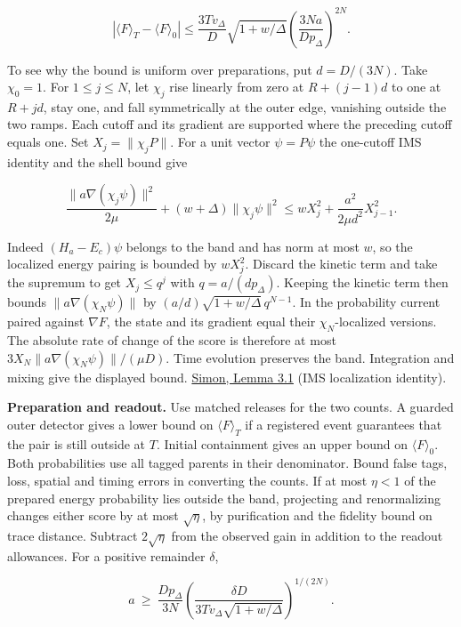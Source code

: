 \documentclass[11pt,a4paper]{article}
\begin{document}
\[
 |\langle F\rangle_T-\langle F\rangle_0|
 \le \frac{3T v_\Delta}{D}\sqrt{1+w/\Delta}
        \left(\frac{3N a}{D p_\Delta}\right)^{2N}.
\]

To see why the bound is uniform over preparations, put \(d=D/(3N)\).
Take \(\chi_0=1\). For \(1\le j\le N\), let \(\chi_j\) rise linearly
from zero at \(R+(j-1)d\) to one at \(R+jd\), stay one, and fall
symmetrically at the outer edge, vanishing outside the two ramps. Each
cutoff and its gradient are supported where the preceding cutoff equals
one. Set \(X_j=\|\chi_jP\|\). For a unit vector \(\psi=P\psi\) the
one-cutoff IMS identity and the shell bound give

\[
 \frac{\|a\nabla(\chi_j\psi)\|^2}{2\mu}
       +(w+\Delta)\|\chi_j\psi\|^2
 \le w X_j^2+\frac{a^2}{2\mu d^2}X_{j-1}^2 .
\]

Indeed \((H_a-E_c)\psi\) belongs to the band and has norm at most \(w\),
so the localized energy pairing is bounded by \(wX_j^2\). Discard the
kinetic term and take the supremum to get \(X_j\le q^j\) with
\(q=a/(d p_\Delta)\). Keeping the kinetic term then bounds
\(\|a\nabla(\chi_N\psi)\|\) by \((a/d)\sqrt{1+w/\Delta}\,q^{N-1}\). In
the probability current paired against \(\nabla F\), the state and its
gradient equal their \(\chi_N\)-localized versions. The absolute rate of
change of the score is therefore at most
\(3X_N\|a\nabla(\chi_N\psi)\|/(\mu D)\). Time evolution preserves the
band. Integration and mixing give the displayed bound.
\href{https://www.numdam.org/item/AIHPA_1983__38_3_295_0.pdf}{Simon,
Lemma 3.1} (IMS localization identity).

\textbf{Preparation and readout.} Use matched releases for the two
counts. A guarded outer detector gives a lower bound on
\(\langle F\rangle_T\) if a registered event guarantees that the pair is
still outside at \(T\). Initial containment gives an upper bound on
\(\langle F\rangle_0\). Both probabilities use all tagged parents in
their denominator. Bound false tags, loss, spatial and timing errors in
converting the counts. If at most \(\eta<1\) of the prepared energy
probability lies outside the band, projecting and renormalizing changes
either score by at most \(\sqrt{\eta}\), by purification and the
fidelity bound on trace distance. Subtract \(2\sqrt{\eta}\) from the
observed gain in addition to the readout allowances. For a positive
remainder \(\delta\),

\[
 a\ \ge\ \frac{D p_\Delta}{3N}
 \left(\frac{\delta D}{3T v_\Delta\sqrt{1+w/\Delta}}\right)^{1/(2N)} .
\]
\end{document}
